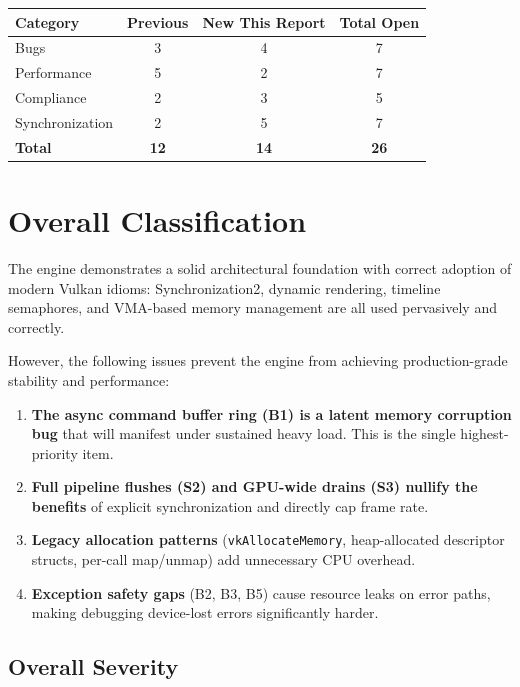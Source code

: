 \documentclass[a4paper,12pt]{article}
\begin{document}
\begin{tabular}{lccc}
\toprule
\textbf{Category} & \textbf{Previous} & \textbf{New This Report} & \textbf{Total Open} \\
\midrule
Bugs & 3 & 4 & 7 \\
Performance & 5 & 2 & 7 \\
Compliance & 2 & 3 & 5 \\
Synchronization & 2 & 5 & 7 \\
\midrule
\textbf{Total} & \textbf{12} & \textbf{14} & \textbf{26} \\
\bottomrule
\end{tabular}

\newpage

\section{Overall Classification}

The engine demonstrates a solid architectural foundation with correct adoption of
modern Vulkan idioms: Synchronization2, dynamic rendering, timeline semaphores,
and VMA-based memory management are all used pervasively and correctly.

However, the following issues prevent the engine from achieving production-grade
stability and performance:

\begin{enumerate}
  \item \textbf{The async command buffer ring (B1) is a latent memory corruption bug}
        that will manifest under sustained heavy load. This is the single highest-priority item.
  \item \textbf{Full pipeline flushes (S2) and GPU-wide drains (S3) nullify the benefits}
        of explicit synchronization and directly cap frame rate.
  \item \textbf{Legacy allocation patterns} (\texttt{vkAllocateMemory}, heap-allocated
        descriptor structs, per-call map/unmap) add unnecessary CPU overhead.
  \item \textbf{Exception safety gaps} (B2, B3, B5) cause resource leaks on error paths,
        making debugging device-lost errors significantly harder.
\end{enumerate}

\subsection*{Overall Severity}
\end{document}
